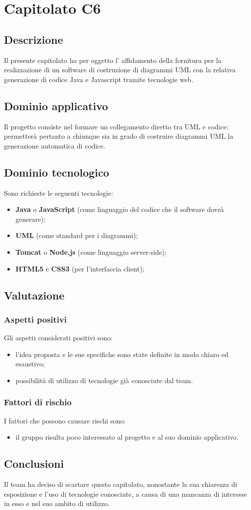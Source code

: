 \section {Capitolato C6}
	\subsection {Descrizione}
	Il presente capitolato ha per oggetto l’ affidamento della fornitura per la realizzazione
di un software di costruzione di diagrammi UML con la relativa generazione di codice
Java e Javascript tramite tecnologie web.
	\subsection {Dominio applicativo}
	Il progetto consiste nel formare un collegamento diretto tra UML e codice: permetterà pertanto a chiunque sia in grado di costruire diagrammi UML la generazione automatica di codice.
	\subsection {Dominio tecnologico}
	Sono richieste le seguenti tecnologie:
	\begin {itemize}
	\item \textbf{Java} o \textbf{JavaScript} (come linguaggio del codice che il software dovrà generare);
	\item \textbf{UML} (come standard per i diagrammi);
	\item \textbf{Tomcat} o \textbf{Node.js} (come linguaggio server-side);
	\item \textbf{HTML5} e \textbf{CSS3} (per l'interfaccia client);
	\end {itemize}
	\subsection {Valutazione}
		\subsubsection {Aspetti positivi}
		Gli aspetti considerati positivi sono:
			\begin {itemize}
			 	\item l'idea proposta e le sue specifiche sono state definite in modo chiaro ed esaustivo;
			 	\item possibilità di utilizzo di tecnologie già conosciute dal team.
			\end {itemize}
		\subsubsection {Fattori di rischio}
		I fattori che possono causare rischi sono:
			\begin {itemize}
				\item il gruppo risulta poco interessato al progetto e al suo dominio applicativo.
			\end {itemize}
	\subsection {Conclusioni}
	Il team ha deciso di scartare questo capitolato, nonostante la sua chiarezza di esposizione e l'uso di tecnologie conosciute, a causa di una mancanza di interesse in esso e nel suo ambito di utilizzo.